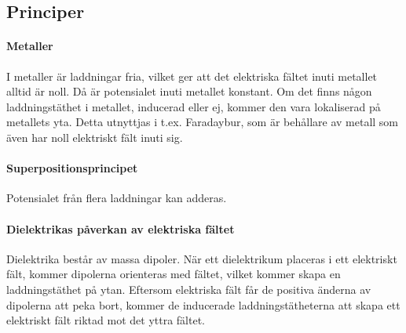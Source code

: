 \subsection{Principer}

\paragraph{Metaller}
I metaller är laddningar fria, vilket ger att det elektriska fältet inuti metallet alltid är noll. Då är potensialet inuti metallet konstant. Om det finns någon laddningstäthet i metallet, inducerad eller ej, kommer den vara lokaliserad på metallets yta. Detta utnyttjas i t.ex. Faradaybur, som är behållare av metall som även har noll elektriskt fält inuti sig.

\paragraph{Superpositionsprincipet}
Potensialet från flera laddningar kan adderas.

\paragraph{Dielektrikas påverkan av elektriska fältet}
Dielektrika består av massa dipoler. När ett dielektrikum placeras i ett elektriskt fält, kommer dipolerna orienteras med fältet, vilket kommer skapa en laddningstäthet på ytan. Eftersom elektriska fält får de positiva änderna av dipolerna att peka bort, kommer de inducerade laddningstätheterna att skapa ett elektriskt fält riktad mot det yttra fältet.